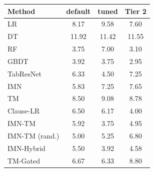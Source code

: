 \begin{tabular}{lccc}
\toprule
Method & default & tuned & Tier 2 \\
\midrule
LR & 8.17 & 9.58 & 7.60 \\
DT & 11.92 & 11.42 & 11.55 \\
RF & 3.75 & 7.00 & 3.10 \\
GBDT & 3.92 & 3.75 & 2.95 \\
TabResNet & 6.33 & 4.50 & 7.25 \\
IMN & 5.83 & 7.25 & 7.65 \\
TM & 8.50 & 9.08 & 8.78 \\
Clause-LR & 6.50 & 6.17 & 4.00 \\
IMN-TM & 5.92 & 3.75 & 4.95 \\
IMN-TM (rand.) & 5.00 & 5.25 & 6.80 \\
IMN-Hybrid & 5.50 & 3.92 & 4.58 \\
TM-Gated & 6.67 & 6.33 & 8.80 \\
\bottomrule
\end{tabular}
